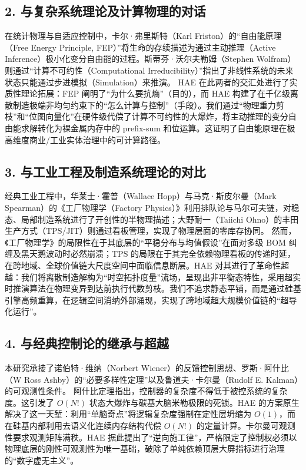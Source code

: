 \documentclass[11pt,a4paper]{article}
\begin{document}
\subsection*{2. 与复杂系统理论及计算物理的对话}
在统计物理与自适应控制中，卡尔·弗里斯特（Karl Friston）的“自由能原理（Free Energy Principle, FEP）”将生命的存续描述为通过主动推理（Active Inference）极小化变分自由能的过程。斯蒂芬·沃尔夫勒姆（Stephen Wolfram）则通过“计算不可约性（Computational Irreducibility）”指出了非线性系统的未来状态只能通过步进模拟（Simulation）来推演。
HAE 在此两者的交汇处进行了实质性理论拓展：FEP 阐明了“为什么要抗熵”（目的），而 HAE 构建了在千亿级离散制造极端非均匀约束下的“怎么计算与控制”（手段）。我们通过“物理重力剪枝”和“位图向量化”在硬件级代偿了计算不可约性的大爆炸，将主动推理的变分自由能求解转化为裸金属内存中的 prefix-sum 和位运算。这证明了自由能原理在极高维度商业/工业实体治理中的可计算路径。

\subsection*{3. 与工业工程及制造系统理论的对比}
经典工业工程中，华莱士·霍普（Wallace Hopp）与马克·斯皮尔曼（Mark Spearman）的《工厂物理学（Factory Physics）》利用排队论与马尔可夫链，对稳态、局部制造系统进行了开创性的半物理描述；大野耐一（Taiichi Ohno）的丰田生产方式（TPS/JIT）则通过看板管理，实现了物理层面的零库存协同。
然而，《工厂物理学》的局限性在于其底层的“平稳分布与均值假设”在面对多级 BOM 纠缠及黑天鹅波动时必然崩溃；TPS 的局限在于其完全依赖物理看板的传递时延，在跨地域、全球价值链大尺度空间中面临信息断层。HAE 对其进行了革命性超越：我们将离散制造解构为“时空拓扑度量”流场，呈现出非平衡态特性，采用超实时推演算法在物理变异到达前执行代数剪枝。我们不追求静态平铺，而是通过硅基引擎高频重算，在逻辑空间消纳外部涌现，实现了跨地域超大规模价值链的“超导化运行”。

\subsection*{4. 与经典控制论的继承与超越}
本研究承接了诺伯特·维纳（Norbert Wiener）的反馈控制思想、罗斯·阿什比（W Ross Ashby）的“必要多样性定理”以及鲁道夫·卡尔曼（Rudolf E. Kalman）的可观测性条件。
阿什比定理指出，控制器的复杂度不得低于被控系统的复杂度。这引发了 $O(N!)$ 状态大爆炸与碳基大脑米勒极限的死锁。HAE 的方案原生解决了这一天堑：利用“单脑奇点”将逻辑复杂度强制在定性层坍缩为 $O(1)$，而在硅基内部利用去语义化连续内存结构代偿 $O(N!)$ 的定量计算。卡尔曼可观测性要求观测矩阵满秩。HAE 据此提出了“逆向施工律”，严格限定了控制权必须以物理底层的刚性可观测性为唯一基础，破除了单纯依赖顶层大屏指标进行治理的“数字虚无主义”。
\end{document}
